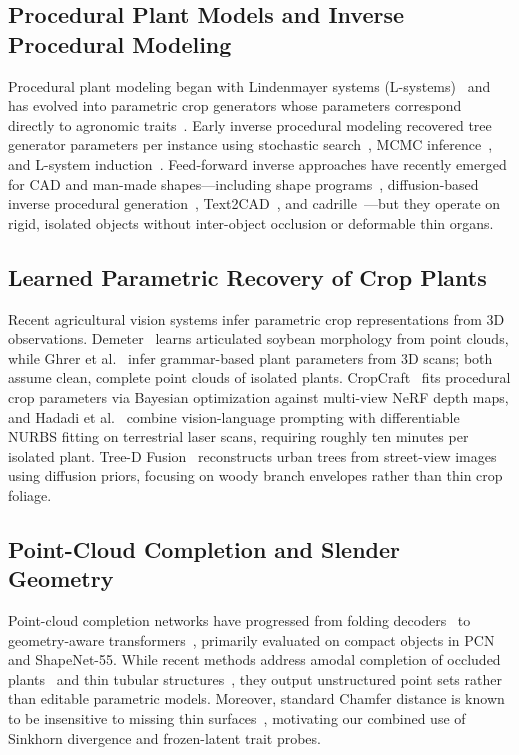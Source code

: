 \documentclass[10pt,twocolumn,letterpaper]{article}
\begin{document}
\subsection{Procedural Plant Models and Inverse Procedural Modeling}
Procedural plant modeling began with Lindenmayer systems (L-systems)~\citep{prusin1990abop} and has evolved into parametric crop generators whose parameters correspond directly to agronomic traits~\citep{floraforge2026,hadadi2025procmaize}. Early inverse procedural modeling recovered tree generator parameters per instance using stochastic search~\citep{stava2014ipmtrees}, MCMC inference~\citep{talton2011metropolis}, and L-system induction~\citep{guo2020ipmlsys,latentlsys2023}. Feed-forward inverse approaches have recently emerged for CAD and man-made shapes---including shape programs~\citep{shapeprograms2019}, diffusion-based inverse procedural generation~\citep{zhao2025dipcg}, Text2CAD~\citep{text2cad2024}, and cadrille~\citep{kolodiazhnyi2025cadrille}---but they operate on rigid, isolated objects without inter-object occlusion or deformable thin organs.

\subsection{Learned Parametric Recovery of Crop Plants}
Recent agricultural vision systems infer parametric crop representations from 3D observations. Demeter~\citep{demeter2025} learns articulated soybean morphology from point clouds, while Ghrer et al.~\citep{ghrer2025paramplants} infer grammar-based plant parameters from 3D scans; both assume clean, complete point clouds of isolated plants. CropCraft~\citep{cropcraft2026} fits procedural crop parameters via Bayesian optimization against multi-view NeRF depth maps, and Hadadi et al.~\citep{hadadi2026vlmmaize,hadadi2025procmaize,nurbsdiff2022} combine vision-language prompting with differentiable NURBS fitting on terrestrial laser scans, requiring roughly ten minutes per isolated plant. Tree-D Fusion~\citep{lee2024treedfusion} reconstructs urban trees from street-view images using diffusion priors, focusing on woody branch envelopes rather than thin crop foliage.

\subsection{Point-Cloud Completion and Slender Geometry}
Point-cloud completion networks have progressed from folding decoders~\citep{yuan2018pcn} to geometry-aware transformers~\citep{yu2021pointr,yu2023adapointr,cai2024einet}, primarily evaluated on compact objects in PCN and ShapeNet-55. While recent methods address amodal completion of occluded plants~\citep{lee2026occ} and thin tubular structures~\citep{curvegaussian2025,qi2026rethinking}, they output unstructured point sets rather than editable parametric models. Moreover, standard Chamfer distance is known to be insensitive to missing thin surfaces~\citep{wu2021dcd,song2026structural,lin2023infocd}, motivating our combined use of Sinkhorn divergence and frozen-latent trait probes.
\end{document}

